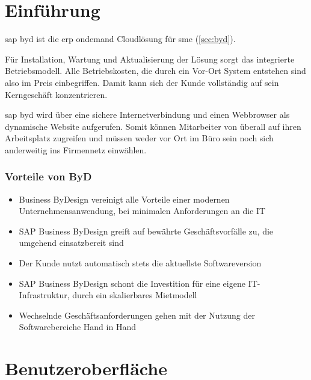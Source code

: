 \section{Einführung}

\gls{sap} \gls{byd} ist die \gls{erp} \gls{ondemand} Cloudlösung für \gls{sme} (\ref{sec:byd}).

Für Installation, Wartung und Aktualisierung der Lösung sorgt das integrierte Betriebsmodell. Alle Betriebskosten, die durch ein Vor-Ort System entstehen sind also im Preis einbegriffen. Damit kann sich der Kunde vollständig auf sein Kerngeschäft konzentrieren.

\gls{sap} \gls{byd} wird über eine sichere Internetverbindung und einen Webbrowser als dynamische Website aufgerufen. Somit können Mitarbeiter von überall auf ihren Arbeitsplatz zugreifen und müssen weder vor Ort im Büro sein noch sich anderweitig ins Firmennetz einwählen.

\subsubsection{Vorteile von ByD}

\begin{itemize}
\item Business ByDesign vereinigt alle Vorteile einer modernen Unternehmensanwendung, bei minimalen Anforderungen an die IT
\item SAP Business ByDesign greift auf bewährte Geschäftsvorfälle zu, die umgehend einsatzbereit sind
\item Der Kunde nutzt automatisch stets die aktuellste Softwareversion
\item SAP Business ByDesign schont die Investition für eine eigene IT-Infrastruktur, durch ein skalierbares Mietmodell
\item Wechselnde Geschäftsanforderungen gehen mit der Nutzung der Softwarebereiche Hand in Hand
\end{itemize}
\cite{itelligence}

\section{Benutzeroberfläche}

